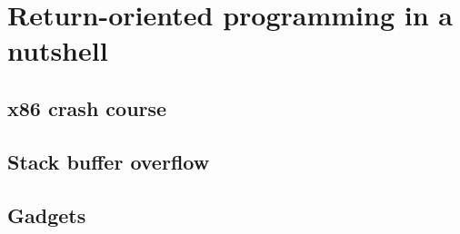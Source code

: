 \section{Return-oriented programming in a nutshell}
\subsection{x86 crash course}



\subsection{Stack buffer overflow}



\subsection{Gadgets}
